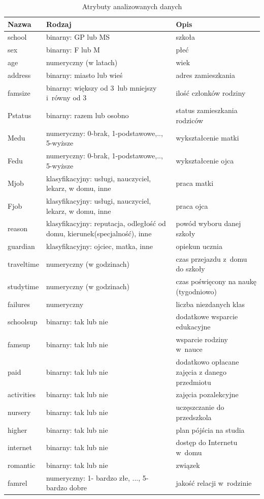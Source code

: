 \begin{table}[h!]
\centering
\caption{Atrybuty analizowanych danych}
\label{tab:attributes}
\begin{tabular}{|p{1.4cm}|p{3cm}|p{3cm}|}
\hline
Nazwa & Rodzaj & Opis \\ \hline
school   &     binarny: GP lub MS &   szkoła \\ \hline
sex   &   binarny: F lub M   &   płeć \\ \hline
age   &   numeryczny (w latach)   &  wiek  \\ \hline
address   &   binarny: miasto lub wieś   &  adres zamieszkania  \\ \hline
famsize   &  binarny: większy od 3\ lub mniejszy i~równy od 3     &  ilość członków rodziny  \\ \hline
Pstatus   &  binarny: razem lub osobno    &  status zamieszkania rodziców  \\ \hline
Medu   &  numeryczny: 0-brak, 1-podstawowe,.., 5-wyższe    &   wykształcenie matki \\ \hline
Fedu   &     numeryczny: 0-brak, 1-podstawowe,.., 5-wyższe &  wykształcenie ojca  \\ \hline
Mjob   &    klasyfikacyjny: usługi, nauczyciel, lekarz, w domu, inne  &  praca matki  \\ \hline
Fjob   &    klasyfikacyjny: usługi, nauczyciel, lekarz, w domu, inne    &  praca ojca  \\ \hline
reason   &   klasyfikacyjny: reputacja, odległość od domu, kierunek(specjalność), inne   &   powód wyboru danej szkoły \\ \hline
guardian   & klasyfikacyjny: ojciec, matka, inne &  opiekun ucznia  \\ \hline
traveltime   &   numeryczny (w godzinach)    &   czas przejazdu z~domu do szkoły    \\ \hline
studytime   &   numeryczny (w godzinach)   &  czas poświęcony na naukę (tygodniowo)  \\ \hline
failures   &   numeryczny   & liczba niezdanych klas   \\ \hline
schoolsup   &  binarny: tak lub nie  & dodatkowe wsparcie edukacyjne   \\ \hline
famsup   &   binarny: tak lub nie   &   wsparcie rodziny w~nauce \\ \hline
paid  &  binarny: tak lub nie    &  dodatkowo opłacane zajęcia z danego przedmiotu  \\ \hline
activities   &  binarny: tak lub nie  &  zajęcia pozalekcyjne    \\ \hline
nursery   &   binarny: tak lub nie   &   uczęszczanie do przedszkola \\ \hline
higher   &  binarny: tak lub nie   &  plan pójścia na studia  \\ \hline
internet   &   binarny: tak lub nie   &  dostęp do Internetu w~domu  \\ \hline
romantic   &   binarny: tak lub nie   &   związek \\ \hline
famrel  &  numeryczny: 1- bardzo złe, ..., 5- bardzo dobre    & jakość relacji w~rodzinie  \\ \hline
\end{tabular}
\end{table}

